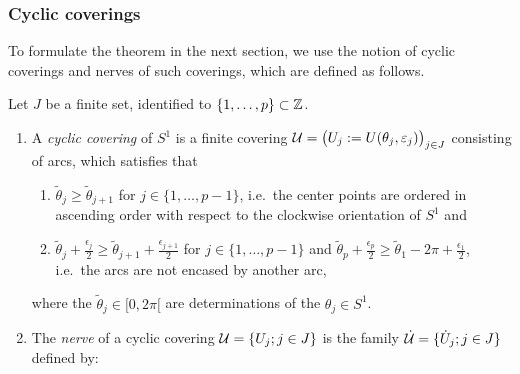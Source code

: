 \subsubsection{Cyclic coverings}
To formulate the theorem in the next section, we use the notion of cyclic
coverings and nerves of such coverings, which are defined as follows.
\begin{defn}
  Let $J$ be a finite set, identified to $\{1,\dots,p\}\subset\mathbb{Z}$.
  \begin{enumerate}
    \item A \emph{cyclic covering} of $S^1$ is a finite covering
      $\mathcal{U}=\big(U_j:=U(\theta_j,\varepsilon_j)\big)_{j\in J}$ consisting of
      arcs, which satisfies that
      \begin{enumerate}
        \item $\tilde\theta_j \geq \tilde\theta_{j+1}$ for
          $j\in\{1,\dots,p-1\}$, i.e.\ the center points are ordered in
          ascending order with respect to the clockwise orientation of $S^1$ and
        \item $\tilde\theta_j+\frac{\epsilon_j}{2}\geq
          \tilde\theta_{j+1}+\frac{\epsilon_{j+1}}{2}$ for
          $j\in\{1,\dots,p-1\}$ and
          $\tilde\theta_p+\frac{\epsilon_p}{2}\geq
          \tilde\theta_{1}-2\pi+\frac{\epsilon_{1}}{2}$, i.e.\ the arcs are not
          encased by another arc,
      \end{enumerate}
      where the $\tilde\theta_j\in [0,2\pi[$ are determinations of the
      $\theta_j\in S^1$.
      \begin{comment}
        \begin{enumerate}
          \item the $\theta_j$ are in ascending order with respect to the
            clockwise orientation of $S^1$;
          \item the $U_j\cap U_{j+1}$ have only one connected component when
            $\#J>2$;
          \item the $U_j$ are not encased by another arc, this means that the
            open sets $U_j\backslash U_l$ are connected for all $j,l\in J$.
        \end{enumerate}
      \end{comment}
    \item The \emph{nerve} of a cyclic covering $\mathcal{U}=\{U_j;j\in J\}$ is the
      family $\dot{\mathcal{U}}=\{\dot U_j;j\in J\}$ defined by:
      \begin{itemize}

\end{itemize}
\end{enumerate}
\end{defn}

